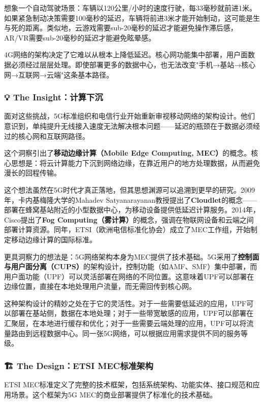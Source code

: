 想象一个自动驾驶场景：车辆以120公里/小时的速度行驶，每33毫秒就前进1米。如果紧急制动决策需要100毫秒的延迟，车辆将前进3米才能开始制动，这可能是生与死的距离。类似地，云游戏需要sub-20毫秒的延迟才能避免操作滞后感，AR/VR需要sub-20毫秒的延迟才能避免眩晕感。

4G网络的架构决定了它难以从根本上降低延迟。核心网功能集中部署，用户面数据必须经过层层处理。即使部署更多的数据中心，也无法改变"手机→基站→核心网→互联网→云端"这条基本路径。

\subsubsection{💡 The Insight：计算下沉}

面对这些挑战，5G标准组织和电信行业开始重新审视移动网络的架构设计。他们意识到，单纯提升无线接入速度无法解决根本问题——延迟的瓶颈在于数据必须经过的核心网和互联网路径。

这个洞察引出了\textbf{移动边缘计算（Mobile Edge Computing, MEC）}的概念。核心思想是：将云计算能力下沉到网络边缘，在靠近用户的地方处理数据，从而避免漫长的回程传输。

这个想法虽然在5G时代才真正落地，但其思想渊源可以追溯到更早的研究。2009年，卡内基梅隆大学的Mahadev Satyanarayanan教授提出了\textbf{Cloudlet}的概念——部署在蜂窝基站附近的小型数据中心，为移动设备提供低延迟计算服务。2014年，Cisco提出了\textbf{Fog Computing（雾计算）}的概念，强调在物联网设备和云端之间部署计算资源。同年，ETSI（欧洲电信标准化协会）成立了MEC工作组，开始制定移动边缘计算的国际标准。

更具洞察力的想法是：5G网络架构本身为MEC提供了技术基础。5G采用了\textbf{控制面与用户面分离（CUPS）}的架构设计，控制功能（如AMF、SMF）集中部署，而用户面功能（UPF）可以灵活部署在网络的不同位置。这意味着UPF可以部署在边缘位置，直接在本地处理用户流量，而无需回传到核心网。

这种架构设计的精妙之处在于它的灵活性。对于一些需要低延迟的应用，UPF可以部署在基站侧，数据在本地处理；对于一些带宽敏感的应用，UPF可以部署在汇聚层，在本地进行缓存和优化；对于一些需要云端处理的应用，UPF可以将流量路由到远程数据中心。同一张5G网络，可以根据应用需求提供不同的服务等级。

\subsubsection{🏗️ The Design：ETSI MEC标准架构}

ETSI MEC标准定义了完整的技术框架，包括系统架构、功能实体、接口规范和应用场景。这个框架为5G MEC的商业部署提供了标准化的技术基础。

